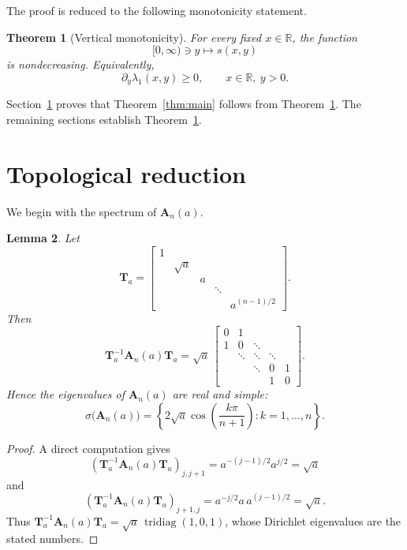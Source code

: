 \documentclass[11pt]{article}
\numberwithin{equation}{section}
\newtheorem{theorem}{Theorem}[section]
\newtheorem{lemma}[theorem]{Lemma}
\begin{document}
The proof is reduced to the following monotonicity statement.

\begin{theorem}[Vertical monotonicity]\label{thm:vertical}
For every fixed $x\in\mathbb{R}$, the function
\[
[0,\infty)\ni y\longmapsto s(x,y)
\]
is nondecreasing.  Equivalently,
\[
\partial_y\lambda_1(x,y)\ge 0,
\qquad x\in\mathbb{R},\ y>0.
\]
\end{theorem}

Section~\ref{sec:topology} proves that Theorem~\ref{thm:main} follows from
Theorem~\ref{thm:vertical}.  The remaining sections establish
Theorem~\ref{thm:vertical}.

\section{Topological reduction}\label{sec:topology}

We begin with the spectrum of $\mathbf A_n(a)$.

\begin{lemma}\label{lem:real-spectrum}
Let
\[
\mathbf T_a=
\begin{bmatrix}
1 \\
& \sqrt a \\
&& a \\
&&& \ddots \\
&&&& a^{(n-1)/2}
\end{bmatrix}.
\]
Then
\[
\mathbf T_a^{-1}\mathbf A_n(a)\mathbf T_a
=
\sqrt a\,
\begin{bmatrix}
0 & 1 \\
1 & 0 & \ddots \\
& \ddots & \ddots & \ddots \\
&& \ddots & 0 & 1 \\
&&& 1 & 0
\end{bmatrix}.
\]
Hence the eigenvalues of $\mathbf A_n(a)$ are real and simple:
\[
\sigma\bigl(\mathbf A_n(a)\bigr)
=
\left\{
2\sqrt a\cos\!\left(\frac{k\pi}{n+1}\right):
k=1,\dots,n
\right\}.
\]
\end{lemma}

\begin{proof}
A direct computation gives
\[
(\mathbf T_a^{-1}\mathbf A_n(a)\mathbf T_a)_{j,j+1}
=
a^{-(j-1)/2}a^{j/2}=\sqrt a
\]
and
\[
(\mathbf T_a^{-1}\mathbf A_n(a)\mathbf T_a)_{j+1,j}
=
a^{-j/2}a\,a^{(j-1)/2}=\sqrt a.
\]
Thus $\mathbf T_a^{-1}\mathbf A_n(a)\mathbf T_a=\sqrt a\,\operatorname{tridiag}(1,0,1)$, whose
Dirichlet eigenvalues are the stated numbers.
\end{proof}
\end{document}
